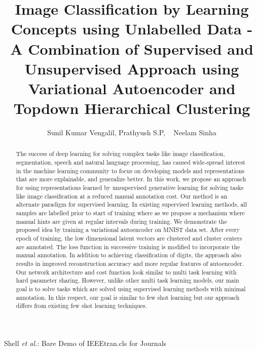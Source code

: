 \documentclass[journal]{IEEEtran}
\begin{document}
%
\title{ Image Classification by Learning Concepts using Unlabelled Data  - A Combination of Supervised and Unsupervised Approach using Variational Autoencoder and Topdown Hierarchical Clustering}
%
%
%

\author{Sunil Kumar Vengalil, Prathyush S.P, ~\IEEEmembership
        Neelam Sinha }


%
{Shell \MakeLowercase{\textit{et al.}}: Bare Demo of IEEEtran.cls for Journals}
\maketitle

\begin{abstract}
The success of deep learning for solving complex tasks like image classification, segmentation, speech and natural language processing, has caused wide-spread interest in the machine learning community to focus on developing models and representations that are more explainable, and generalize better. In this work, we propose an approach for using representations learned by unsupervised generative learning for solving tasks like image classification at a reduced manual annotation cost. Our method is an alternate paradigm for supervised learning. In existing supervised learning methods,  all samples are labelled prior to start of training where as we propose a mechanism where manual hints are given at regular intervals during training. We demonstrate the proposed idea by training a  variational autoencoder on MNIST data set. After every epoch of training, the low dimensional latent vectors are clustered and cluster centers are annotated. The loss function in successive training is modified to incorporate the manual annotation. In addition to achieving classification of digits, the approach also results in improved reconstruction accuracy and more regular features of autoencoder. Our network architecture and cost function look similar to multi task learning with hard parameter sharing. However, unlike other multi task learning models, our main goal is to solve tasks which are solved using supervised learning methods with minimal annotation. In this respect, our goal is similar to few shot learning but our approach differs from existing few shot learning techniques.

\end{abstract}
\end{document}
